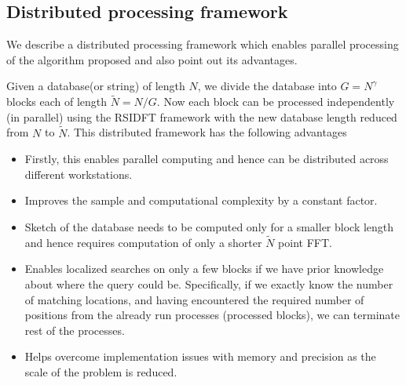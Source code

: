 \subsection{Distributed processing framework}
We describe a distributed processing framework which enables parallel processing of the algorithm proposed and also point out its advantages.

Given a database(or string) of length $N$, we divide the database into $G=N^\gamma$ blocks each of length $\tilde{N} = N/G$. Now each block can be processed independently (in parallel) using the RSIDFT framework with the new database length reduced from $N$ to $\tilde{N}$. This distributed framework has the following advantages
\begin{itemize}
	\item Firstly, this enables parallel computing and hence can be distributed across different workstations.
	\item Improves the sample and computational complexity by a constant factor.
	\item Sketch of the database needs to be computed only for a smaller block length and hence requires computation of only a shorter $\tilde{N}$ point FFT.
	\item Enables localized searches on only a few blocks if we have prior knowledge about where the query could be. Specifically, if we exactly know the number of matching locations, and having encountered the required number of positions from the already run processes (processed blocks), we can terminate rest of the processes.   
	\item Helps overcome implementation issues with memory and precision as the scale of the problem is reduced. 
\end{itemize}

